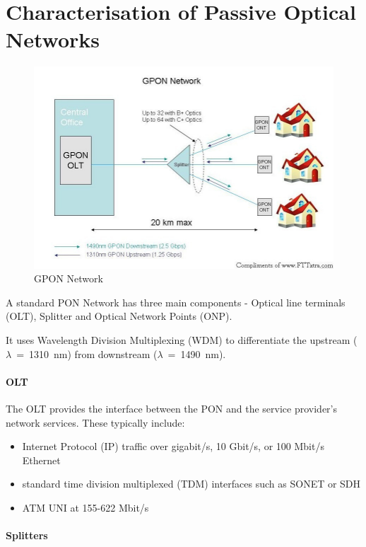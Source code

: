 \section{Characterisation of Passive Optical Networks}

\begin{figure}%
\includegraphics[width=\columnwidth]{grafiken/gpon.jpg}%
\caption{GPON Network}%
\label{}%
\end{figure}

A standard PON Network has three main components - Optical line terminals (OLT), Splitter and Optical Network Points (ONP).

It uses Wavelength Division Multiplexing (WDM) to differentiate the upstream ($\lambda$~=~1310~nm) from downstream ($\lambda~=~$1490~nm).

\paragraph{OLT}
The OLT provides the interface between the PON and the service provider's network services. These typically include:

\begin{itemize}
	\item Internet Protocol (IP) traffic over gigabit/s, 10 Gbit/s, or 100 Mbit/s Ethernet
\item standard time division multiplexed (TDM) interfaces such as SONET or SDH
\item ATM UNI at 155-622 Mbit/s
\end{itemize}

\paragraph{Splitters}

